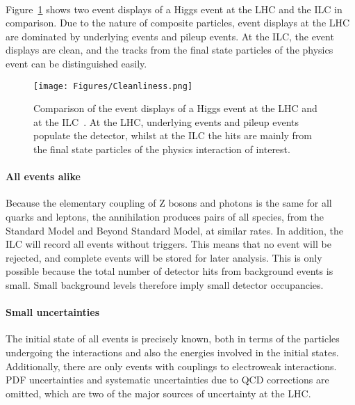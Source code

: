 \\Figure~\ref{fig:Cleanliness} shows two event displays of a Higgs event at the LHC and the ILC in comparison.
Due to the nature of composite particles, event displays at the LHC are dominated by underlying events and pileup events.
At the ILC, the event displays are clean, and the tracks from the final state particles of the physics event can be distinguished easily.
\begin{figure}[H]
\centering
\texttt{[image: Figures/Cleanliness.png]}
\caption[Clean environment at the ILC]{Comparison of the event displays of a Higgs event at the  LHC and at the ILC~\cite[based on p. 4]{ILCPhysics_Thomson}.
At the LHC, underlying events and pileup events populate the detector, whilst at the ILC the hits are mainly from the final state particles of the physics interaction of interest.
}
\label{fig:Cleanliness}
\end{figure}

\paragraph{All events alike}
Because the elementary coupling of Z bosons and photons is the same for all quarks and leptons, the \positron\electron annihilation produces pairs of all species, from the Standard Model and Beyond Standard Model, at similar rates.
In addition, the ILC will record all events without triggers.
This means that no event will be rejected, and complete events will be stored for later analysis.
This is only possible because the total number of detector hits from background events is small.
Small background levels therefore imply small detector occupancies.

\paragraph{Small uncertainties}
The initial state of all events is precisely known, both in terms of the particles undergoing the interactions and also the energies involved in the initial states.
Additionally, there are only events with couplings to electroweak interactions.\\
PDF uncertainties and systematic uncertainties due to QCD corrections are omitted, which are two of the major sources of uncertainty at the LHC.

